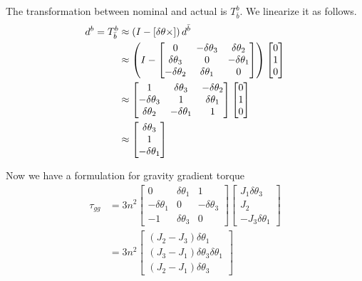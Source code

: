 \documentclass[]{article}
\begin{document}
The transformation between nominal and actual is $T_{\bar{b}}^b$. We linearize it as follows.
\begin{align}
	d^b = T_{\bar{b}}^b & \approx \left(I - \left[ \delta \theta \times \right]\right) d^{\bar{b}} \\
	& \approx \left(I - \begin{bmatrix}
		0 & -\delta \theta_3 & \delta \theta_2 \\
		\delta \theta_3 & 0 & -\delta \theta_1 \\
		-\delta \theta_2 & \delta \theta_1 & 0
	\end{bmatrix}\right) \begin{bmatrix}
	0 \\
	1 \\
	0
\end{bmatrix} \\
& \approx  \begin{bmatrix}
	1 & \delta \theta_3 & -\delta \theta_2 \\
	-\delta \theta_3 & 1 & \delta \theta_1 \\
	\delta \theta_2 & -\delta \theta_1 & 1
\end{bmatrix} \begin{bmatrix}
	0 \\
	1 \\
	0
\end{bmatrix} \\
& \approx \begin{bmatrix}
	\delta \theta_3 \\
	1 \\
	- \delta \theta_1
\end{bmatrix}
\end{align}

Now we have a formulation for gravity gradient torque
\begin{align}
	\tau_{gg} & = 3 n^2 \begin{bmatrix}
		0 & \delta \theta_1 & 1 \\
		-\delta \theta_1 & 0 & -\delta \theta_3 \\
		-1 & \delta \theta_3 & 0 
	\end{bmatrix} \begin{bmatrix}
	J_1 \delta \theta_3 \\
	J_2 \\
	-J_3 \delta \theta_1
\end{bmatrix} \\
& = 3 n^2 \begin{bmatrix}
	(J_2 - J_3) \delta \theta_1 \\
	(J_3 - J_1) \delta \theta_3 \delta \theta_1 \\
	(J_2 - J_1) \delta \theta_3
\end{bmatrix}
\end{align}
\end{document}
